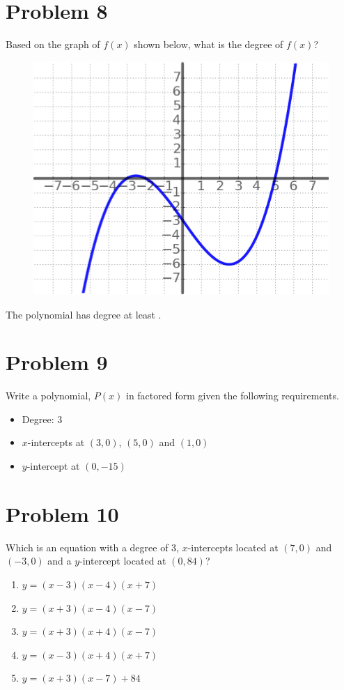 \documentclass[12pt]{article}
\begin{document}
\section*{Problem 8}
Based on the graph of $f(x)$ shown below, what is the degree of $f(x)$?\\
\begin{figure}[!ht]
    \centering
    \includegraphics[width=0.5\linewidth]{3.png}
\end{figure}

The polynomial has degree at least \underline{\hspace{1cm}}.

\section*{Problem 9}
Write a polynomial, $P(x)$ in factored form given the following requirements.

\begin{itemize}
    \item Degree: 3
    \item $x$-intercepts at $(3,0)$, $(5,0)$ and $(1,0)$
    \item $y$-intercept at $(0,-15)$
\end{itemize}

\newpage
\section*{Problem 10}
Which is an equation with a degree of 3, $x$-intercepts located at $(7, 0)$ and $(-3, 0)$ and a $y$-intercept located at $(0, 84)$?

\begin{enumerate}[label=\Alph*)]
    \item $y = (x-3)(x-4)(x+7)$
    \item $y = (x+3)(x-4)(x-7)$
    \item $y = (x+3)(x+4)(x-7)$
    \item $y = (x-3)(x+4)(x+7)$
    \item $y = (x+3)(x-7)+84$
\end{enumerate}
\end{document}
